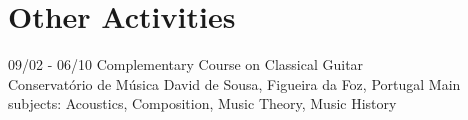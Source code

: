 \documentclass[]{friggeri-cv}
\begin{document}
\section{Other Activities}
\begin{entrylist}
  \entry
    {09/02 - 06/10}
    {Complementary Course on Classical Guitar}
    {\\Conservatório de Música David de Sousa, Figueira da Foz, Portugal}
    {Main subjects: Acoustics, Composition, Music Theory, Music History}
\end{entrylist}
%
% 
%
\end{document}
